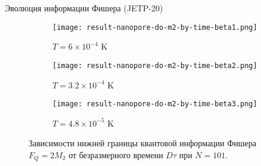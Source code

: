 

\begin{frame}{Эволюция информации Фишера (JETP-20)}
  \begin{figure}
    \begin{subfigure}[t]{0.3\textwidth}
    \texttt{[image: result-nanopore-do-m2-by-time-beta1.png]}
    \caption{$T = 6 \times 10^{-4}$ K}
    \end{subfigure}
    \hfill
    \begin{subfigure}[t]{0.3\textwidth}
      \texttt{[image: result-nanopore-do-m2-by-time-beta2.png]}
      \caption{$T = 3.2 \times 10^{-4}$ K}
    \end{subfigure}
    \hfill
    \begin{subfigure}[t]{0.3\textwidth}
      \texttt{[image: result-nanopore-do-m2-by-time-beta3.png]}
      \caption{$T = 4.8 \times 10^{-5}$ K}
    \end{subfigure}
    \caption{Зависимости нижней границы квантовой информации Фишера $F_Q = 2M_2$ от безразмерного времени $D\tau$ при $N = 101$.}
  \end{figure}
\end{frame}


